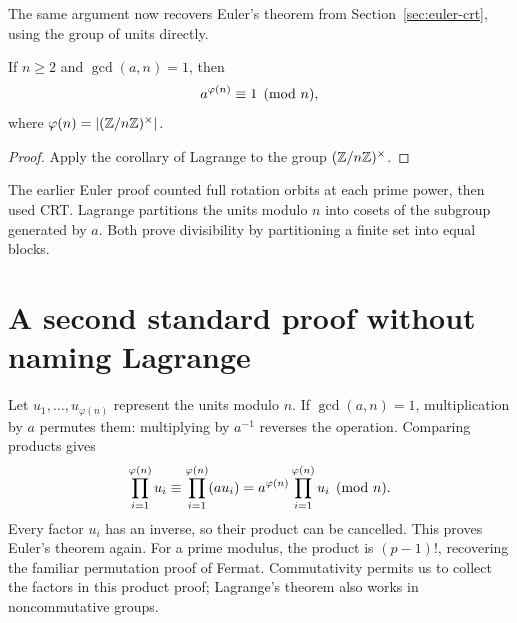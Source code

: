 The same argument now recovers Euler's theorem from
Section~\ref{sec:euler-crt}, using the group of units directly.

\begin{theorem}[Euler]
If $n\ge2$ and $\gcd(a,n)=1$, then
\[
a^{\varphi(n)}\equiv1\pmod n,
\]
where $\varphi(n)=\left|(\mathbb Z/n\mathbb Z)^\times\right|$.
\end{theorem}

\begin{proof}
Apply the corollary of Lagrange to the group $(\mathbb Z/n\mathbb Z)^\times$.
\end{proof}

\begin{bigidea}
The earlier Euler proof counted full rotation orbits at each prime
power, then used CRT. Lagrange partitions the units modulo $n$ into
cosets of the subgroup generated by $a$. Both prove divisibility by
partitioning a finite set into equal blocks.
\end{bigidea}

\section{A second standard proof without naming Lagrange}

Let $u_1,\ldots,u_{\varphi(n)}$ represent the units modulo $n$.
If $\gcd(a,n)=1$, multiplication by $a$ permutes them: multiplying by
$a^{-1}$ reverses the operation. Comparing products gives
\[
 \prod_{i=1}^{\varphi(n)}u_i
 \equiv\prod_{i=1}^{\varphi(n)}(au_i)
 =a^{\varphi(n)}\prod_{i=1}^{\varphi(n)}u_i\pmod n.
\]
Every factor $u_i$ has an inverse, so their product can be cancelled.
This proves Euler's theorem again. For a prime modulus, the product is
$(p-1)!$, recovering the familiar permutation proof of Fermat.
Commutativity permits us to collect the factors in this product proof;
Lagrange's theorem also works in noncommutative groups.

